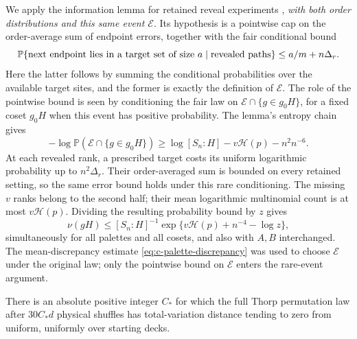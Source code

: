 We apply the information lemma for retained reveal experiments
\cite[Lemma~\ref*{l-l:palette-information}]{partialFourier},
\emph{with both order distributions and this same event $\mathcal E$}.
Its hypothesis is a pointwise cap on the
order-average sum of endpoint errors, together with the fair conditional
bound
\[
 \mathbb P\{\hbox{next endpoint lies in a target set of size }a
               \mid\hbox{revealed paths}\}
 \le a/m+n\Delta_r.
\]
Here the latter follows by summing the conditional probabilities over
the available target sites, and the former is exactly the definition
of $\mathcal E$. The role of the pointwise bound is seen by conditioning
the fair law on $\mathcal E\cap\{g\in g_0H\}$, for a fixed coset
$g_0H$ when this event has positive probability. The lemma's entropy chain gives
\[
 -\log\mathbb P(\mathcal E\cap\{g\in g_0H\})
 \ge \log[S_n:H]-v\mathcal H(p)-n^2n^{-6}.
\]
At each revealed rank, a prescribed target costs its uniform
logarithmic probability up to $n^2\Delta_r$. Their order-averaged sum
is bounded on every retained setting, so the same error bound holds
under this rare conditioning. The missing $v$ ranks belong to the
second half; their mean logarithmic multinomial count is at most
$v\mathcal H(p)$. Dividing the resulting probability bound by $z$ gives
\begin{equation}
 \nu(gH)\le [S_n:H]^{-1}
     \exp\{v\mathcal H(p)+n^{-4}-\log z\},
 \label{eq:c-palette-coset-cap}
\end{equation}
simultaneously for all palettes and all cosets, and also with $A,B$
interchanged. The mean-discrepancy estimate
\eqref{eq:c-palette-discrepancy} was used to choose $\mathcal E$ under
the original law; only the pointwise bound on $\mathcal E$ enters
the rare-event argument.

\begin{corollary}
\label{cor:c-palette-mixing}
There is an absolute positive integer $C_*$ for which the full Thorp
permutation law after $30C_*d$ physical shuffles has total-variation
distance tending to zero from uniform, uniformly over starting decks.
\end{corollary}

